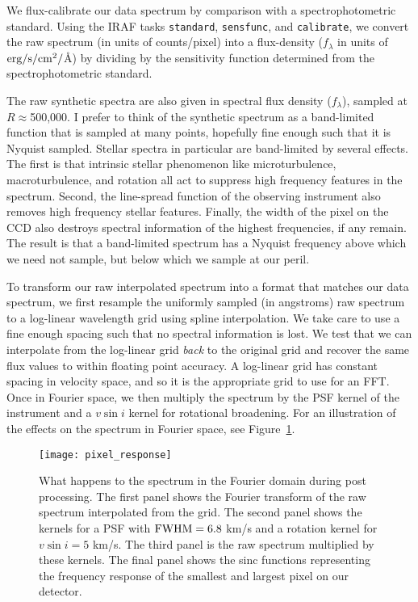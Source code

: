 \documentclass[preprint]{aastex} %
\begin{document}
We flux-calibrate our data spectrum by comparison with a spectrophotometric standard. Using the IRAF tasks \texttt{standard}, \texttt{sensfunc}, and \texttt{calibrate}, we convert the raw spectrum (in units of counts/pixel) into a flux-density ($f_\lambda$ in units of ${\rm erg}/{\rm s}/{\rm cm}^2/$\AA) by dividing by the sensitivity function determined from the spectrophotometric standard.

The raw synthetic spectra are also given in spectral flux density ($f_\lambda$), sampled at $R\approx$500,000. I prefer to think of the synthetic spectrum as a band-limited function that is sampled at many points, hopefully fine enough such that it is Nyquist sampled. Stellar spectra in particular are band-limited by several effects. The first is that intrinsic stellar phenomenon like microturbulence, macroturbulence, and rotation all act to suppress high frequency features in the spectrum.  Second, the line-spread function of the observing instrument also removes high frequency stellar features. Finally, the width of the pixel on the CCD also destroys spectral information of the highest frequencies, if any remain. The result is that a band-limited spectrum has a Nyquist frequency above which we need not sample, but below which we sample at our peril.

To transform our raw interpolated spectrum into a format that matches our data spectrum, we first resample the uniformly sampled (in angstroms) raw spectrum to a log-linear wavelength grid using spline interpolation. We take care to use a fine enough spacing such that no spectral information is lost. We test that we can interpolate from the log-linear grid \emph{back} to the original grid and recover the same flux values to within floating point accuracy. A log-linear grid has constant spacing in velocity space, and so it is the appropriate grid to use for an FFT. Once in Fourier space, we then multiply the spectrum by the PSF kernel of the instrument and a $v \sin i$ kernel for rotational broadening. For an illustration of the effects on the spectrum in Fourier space, see Figure~\ref{fig:pixel_response}.

\begin{figure}[!htb]
\begin{center}
  \texttt{[image: pixel\_response]}
  \caption{What happens to the spectrum in the Fourier domain during post processing. The first panel shows the Fourier transform of the raw spectrum interpolated from the grid. The second panel shows the kernels for a PSF with ${\rm FWHM} = 6.8$ km/s and a rotation kernel for $v\sin i = 5$ km/s. The third panel is the raw spectrum multiplied by these kernels. The final panel shows the sinc functions representing the frequency response of the smallest and largest pixel on our detector.}
\label{fig:pixel_response}
\end{center}
\end{figure}
\end{document}
